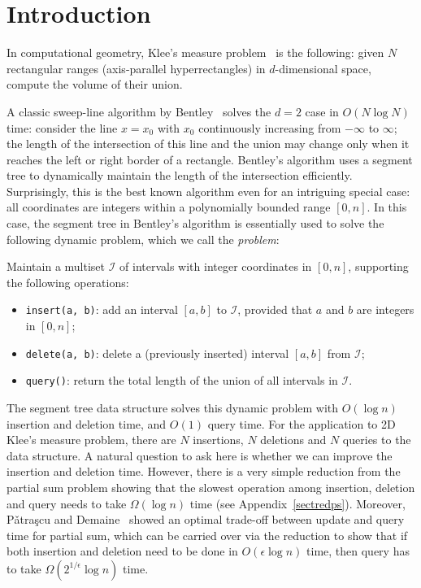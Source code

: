 \documentclass[11pt]{article}
\begin{document}
\newpage

\section{Introduction}
In computational geometry, Klee's measure problem~\cite{Klee77, Bent77, Chan13} is the following: given $N$ rectangular ranges (axis-parallel hyperrectangles) in $d$-dimensional space, compute the volume of their union.

A classic sweep-line algorithm by Bentley~\cite{Bent77} solves the $d=2$ case in $O(N\log N)$ time: consider the line $x=x_0$ with $x_0$ continuously increasing from $-\infty$ to $\infty$; the length of the intersection of this line and the union may change only when it reaches the left or right border of a rectangle. Bentley's algorithm uses a segment tree to dynamically maintain the length of the intersection efficiently. Surprisingly, this is the best known algorithm even for an intriguing special case: all coordinates are integers within a polynomially bounded range $[0, n]$. In this case, the segment tree in Bentley's algorithm is essentially used to solve the following dynamic problem, which we call the \emph{\diu{} problem}:

Maintain a multiset $\mathcal{I}$ of intervals with integer coordinates in $[0, n]$, supporting the following operations:

\begin{itemize}
	\item
		\verb+insert(a, b)+: add an interval $[a, b]$ to $\mathcal{I}$, provided that $a$ and $b$ are integers in $[0, n]$;
	\item
		\verb+delete(a, b)+: delete a (previously inserted) interval $[a, b]$ from $\mathcal{I}$;
	\item
		\verb+query()+: return the total length of the union of all intervals in $\mathcal{I}$.
\end{itemize}

The segment tree data structure solves this dynamic problem with $O(\log n)$ insertion and deletion time, and $O(1)$ query time. For the application to 2D Klee's measure problem, there are $N$ insertions, $N$ deletions and $N$ queries to the data structure. A natural question to ask here is whether we can improve the insertion and deletion time. However, there is a very simple reduction from the partial sum problem showing that the slowest operation among insertion, deletion and query needs to take $\Omega(\log n)$ time (see Appendix~\ref{sectredps}). Moreover, P\v{a}tra\c{s}cu and Demaine~\cite{PD04b, PD06} showed an optimal trade-off between update and query time for partial sum, which can be carried over via the reduction to show that if both insertion and deletion need to be done in $O(\epsilon \log n)$ time, then query has to take $\Omega(2^{1/\epsilon}\log n)$ time. 
\end{document}
